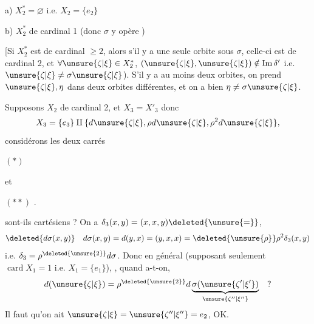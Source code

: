 a) $X_2^*=\varnothing$ i.e. $X_2=\{e_2\}$

b) $X_2^*$ de cardinal 1 (donc $\sigma$  y opère )


[Si $X_2^*$ est de cardinal $\geq2$, alors s'il y a une seule orbite sous $\sigma$, celle-ci est de cardinal 2, et \deleted{$\unsure{\xi}$} $\forall\unsure{\zeta|\xi}\in X_2^*$, $(\unsure{\zeta|\xi},\unsure{\zeta|\xi})\notin\operatorname{Im}\delta'$ i.e. $\unsure{\zeta|\xi}\ne\sigma\unsure{\zeta|\xi}$). S'il y a  au moins deux orbites, on prend $\unsure{\zeta|\xi},\eta$ dans deux orbites différentes, et on a bien $\eta\ne\sigma\unsure{\zeta|\xi}$.


Supposons  $X_2$ de cardinal 2,  et  $X_3=X'_3$ donc
\[
X_3=\{e_3\}\amalg\{d\unsure{\zeta|\xi},\rho d\unsure{\zeta|\xi},\rho^2d\unsure{\zeta|\xi}\},
\]
considérons les deux carrés

$(*)$

et

$(**)$
.

sont-ils cartésiens ? On a $\delta_3(x,y)=(x,x,y)\deleted{\unsure{=}}$,
\[
\deleted{d\sigma(x,y)}\quad d\sigma(x,y)=d(y,x)=(y,x,x)=\deleted{\unsure{\rho}}\rho^2\delta_3(x,y)
\]
i.e. $\delta_3=\rho^{\deleted{\unsure{2}}}d\sigma$. Donc en général (supposant seulement $\operatorname{card}X_1=1$ i.e. $X_1=\{e_1\}$),  , quand a-t-on, 
\[
d(\unsure{\zeta|\xi})=\rho^{\deleted{\unsure{2}}}d\underbrace{\sigma(\unsure{\zeta'|\xi'})}_{\unsure{\zeta''|\xi''}}\quad ?
\]
Il faut  qu'on ait 
$\unsure{\zeta|\xi}=\unsure{\zeta''|\xi''}=e_2$,  $\boxed{\text{OK}}$.

